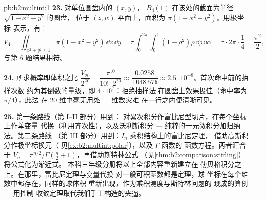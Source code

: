 \begin{solution}{pb:b2:multint:1}
\textbf{23.} 对单位圆盘内的 $(x, y)$，
$B_4(1)$ 在该处的截面为半径 $\sqrt{1 - x^2 - y^2}$ 的圆盘，
位于 $(z, w)$ 平面上，面积为 $\pi(1 - x^2 - y^2)$。用极坐标
表示，有：
\[
V_4 = \iint_{x^2+y^2\leq1}\pi(1 - x^2 - y^2)\,\dd x\,\dd y
= \pi\int_0^{2\pi}\!\!\int_0^1(1 - \rho^2)\rho\,
\dd\rho\,\dd\alpha
= \pi\cdot2\pi\cdot\frac14 = \frac{\pi^2}2 ,
\]
与第 6 题结果相符。

\textbf{24.} 所求概率即体积之比
$\dfrac{V_{20}}{2^{20}} = \dfrac{\pi^{10}}{10!\cdot2^{20}}
\approx \dfrac{0.0258}{1\,048\,576} \approx
2.5\cdot10^{-8}$。首次命中前的抽样次数
约为其倒数的量级，即 $4\cdot10^7$：拒绝抽样法
在圆盘上效果极佳（命中率为 $\pi/4$），此法
在 $20$ 维中毫无用处 --- 维数灾难
在一行之内便清晰可见。

\textbf{25.} 第一条路线（第 I--II 部分）用到：
对累次积分作富比尼型切片，在每个坐标上作单变量
代换（利用齐次性），以及沃利斯积分
--- 纯粹的一元微积分加归纳法。第二条路线
（第 III 部分）用到：$I_n$ 乘积结构上的富比尼定理，
借助高斯积分作极坐标换元（
见\cref{ex:b2:multint:polar}），以及 $\Gamma$ 函数的
函数方程。两者汇合于 $V_n =
\pi^{n/2}/\Gamma(\frac n2 + 1)$，再借助斯特林公式
（见\cref{thm:b2:comparison:stirling}）将公式化为渐近式。
本科三年级分册将以上全部内容重新建立在
勒贝格积分之上。在那里，富比尼定理与变量代换
对一般可积函数都是定理，球
坐标在每个维数中都存在，同样的球体积
重新出现，作为乘积测度与斯特林问题的
现成的算例 --- 用控制
收敛定理取代我们手工构造的夹逼。
\end{solution}
